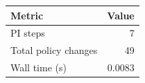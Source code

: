 \begin{tabular}{lr}
\hline
Metric & Value \\
\hline
PI steps & 7 \\
Total policy changes & 49 \\
Wall time (s) & 0.0083 \\
\hline
\end{tabular}